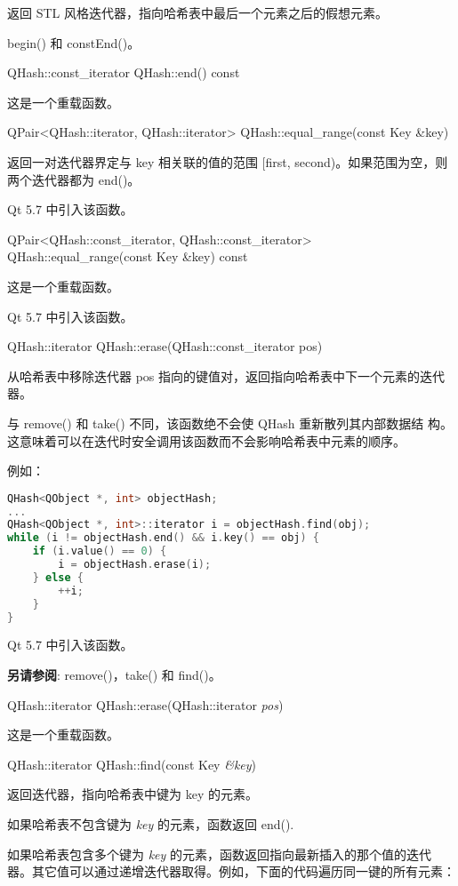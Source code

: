 返回 STL 风格迭代器，指向哈希表中最后一个元素之后的假想元素。

\begin{notice}[另请参阅]
begin() 和 constEnd()。
\end{notice}

QHash::const\_iterator QHash::end() const

这是一个重载函数。

QPair<QHash::iterator, QHash::iterator> QHash::equal\_range(const Key \&key)

返回一对迭代器界定与 key 相关联的值的范围 [first, second)。如果范围为空，则两个迭代器都为 end()。

Qt 5.7 中引入该函数。

QPair<QHash::const\_iterator, QHash::const\_iterator> QHash::equal\_range(const Key \&key) const

这是一个重载函数。

Qt 5.7 中引入该函数。

QHash::iterator QHash::erase(QHash::const\_iterator pos)

从哈希表中移除迭代器 pos 指向的键值对，返回指向哈希表中下一个元素的迭代器。

与 remove() 和 take() 不同，该函数绝不会使 QHash 重新散列其内部数据结
构。这意味着可以在迭代时安全调用该函数而不会影响哈希表中元素的顺序。

例如：

\begin{lstlisting}[language=C++]
QHash<QObject *, int> objectHash;
...
QHash<QObject *, int>::iterator i = objectHash.find(obj);
while (i != objectHash.end() && i.key() == obj) {
    if (i.value() == 0) {
        i = objectHash.erase(i);
    } else {
        ++i;
    }
}
\end{lstlisting}

Qt 5.7 中引入该函数。

\textbf{另请参阅}: remove()，take() 和 find()。

QHash::iterator QHash::erase(QHash::iterator \emph{pos})

这是一个重载函数。

QHash::iterator QHash::find(const Key \emph{\&key})

返回迭代器，指向哈希表中键为 key 的元素。

如果哈希表不包含键为 \emph{key} 的元素，函数返回 end().

如果哈希表包含多个键为 \emph{key} 的元素，函数返回指向最新插入的那个值的迭代器。其它值可以通过递增迭代器取得。例如，下面的代码遍历同一键的所有元素：

